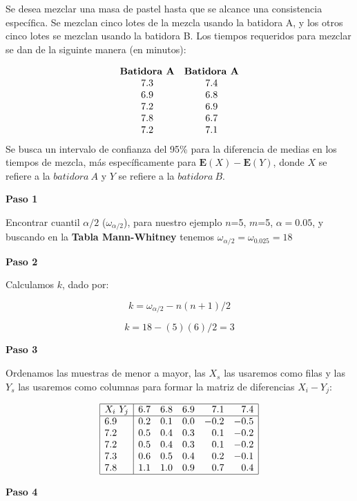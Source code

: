 \documentclass[
  a4paper,
  oneside,
  openany]{book}
\begin{document}
Se desea mezclar una masa de pastel hasta que se alcance una consistencia específica. Se mezclan cinco lotes de la mezcla usando la batidora A, y los otros cinco lotes se mezclan usando la batidora B. Los tiempos requeridos para mezclar se dan de la siguinte manera (en minutos):

\[
\begin{array}{c c}
\textbf{Batidora A} & \textbf{Batidora A} \\
7.3 & 7.4 \\
6.9 & 6.8  \\
7.2 & 6.9 \\
7.8 & 6.7 \\
7.2 & 7.1 \\
\end{array}
\]
Se busca un intervalo de confianza del 95\% para la diferencia de medias en los tiempos de mezcla, más específicamente para \(\mathbf{E}(X)-\mathbf{E}(Y)\), donde \(X\) se refiere a la \(batidora\ A\) y \(Y\) se refiere a la \(batidora\ B\).

\textbf{Paso 1}

Encontrar cuantil \(\alpha/2\) (\(\omega_{\alpha/2}\)), para nuestro ejemplo \(n\)=5, \(m\)=5, \(\alpha=0.05\), y buscando en la \textbf{Tabla Mann-Whitney} tenemos \(\omega_{\alpha/2}=\omega_{0.025}=18\)

\textbf{Paso 2}

Calculamos \(k\), dado por:

\[k= \omega_{\alpha/2}-n(n+1)/2\]

\[k=18-(5)(6)/2=3\]

\textbf{Paso 3}

Ordenamos las muestras de menor a mayor, las \(X_s\) las usaremos como filas y las \(Y_s\) las usaremos como columnas para formar la matriz de diferencias \(X_{i}-Y_{j}\):

\[
\begin{array}{|l| r r r r r|}
\hline
X_{i} \ Y_{j} & 6.7 & 6.8 & 6.9 & 7.1 & 7.4 \\
\hline
6.9 & 0.2 & 0.1 & 0.0 & -0.2 & -0.5 \\
7.2 & 0.5 & 0.4 & 0.3 &  0.1 & -0.2 \\
7.2 & 0.5 & 0.4 & 0.3 &  0.1 & -0.2 \\
7.3 & 0.6 & 0.5 & 0.4 &  0.2 & -0.1 \\
7.8 & 1.1 & 1.0 & 0.9 &  0.7 &  0.4 \\
\hline
\end{array}
\]

\textbf{Paso 4}
\end{document}
